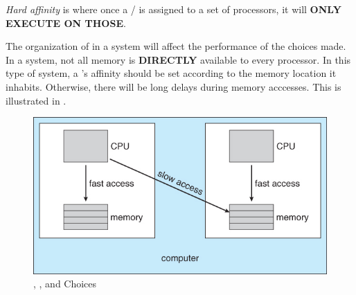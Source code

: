 \begin{definition}\label{def:Hard_Affinity}
  \emph{Hard affinity} is where once a / is assigned to a set of processors, it will \textbf{ONLY EXECUTE ON THOSE}.
\end{definition}

The organization of  in a system will affect the performance of the  choices made.
In a  system, not all memory is \textbf{DIRECTLY} available to every processor.
In this type of system, a 's affinity should be set according to the memory location it inhabits.
Otherwise, there will be long delays during memory acccesses.
This is illustrated in .

\begin{figure}[h!tbp]
  \centering
  \includegraphics[scale=1.00]{./Drawings/EDAF35-Operating_Systems/NUMA_Multiprocessor_Scheduling.jpg}
  \caption{, , and  Choices}
  \label{fig:NUMA_Multiprocessor_Scheduling}
\end{figure}


